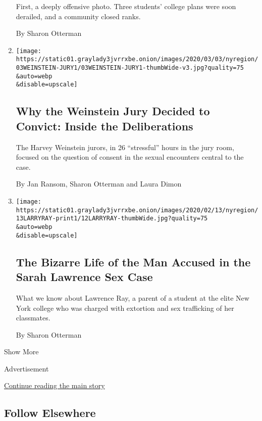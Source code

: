 \begin{enumerate}
  First, a deeply offensive photo. Three students' college plans were
  soon derailed, and a community closed ranks.

  By Sharon Otterman
\item
  \href{/2020/03/02/nyregion/weinstein-verdict-jury.html}{}

  \texttt{[image: https://static01.graylady3jvrrxbe.onion/images/2020/03/03/nyregion/03WEINSTEIN-JURY1/03WEINSTEIN-JURY1-thumbWide-v3.jpg?quality=75\\\&auto=webp\\\&disable=upscale]}

  \hypertarget{why-the-weinstein-jury-decided-to-convict-inside-the-deliberations}{%
  \subsection{Why the Weinstein Jury Decided to Convict: Inside the
  Deliberations}\label{why-the-weinstein-jury-decided-to-convict-inside-the-deliberations}}

  The Harvey Weinstein jurors, in 26 ``stressful'' hours in the jury
  room, focused on the question of consent in the sexual encounters
  central to the case.

  By Jan Ransom, Sharon Otterman and Laura Dimon
\item
  \href{/2020/02/12/nyregion/larry-ray-sarah-lawrence.html}{}

  \texttt{[image: https://static01.graylady3jvrrxbe.onion/images/2020/02/13/nyregion/13LARRYRAY-print1/12LARRYRAY-thumbWide.jpg?quality=75\\\&auto=webp\\\&disable=upscale]}

  \hypertarget{the-bizarre-life-of-the-man-accused-in-the-sarah-lawrence-sex-case}{%
  \subsection{The Bizarre Life of the Man Accused in the Sarah Lawrence
  Sex
  Case}\label{the-bizarre-life-of-the-man-accused-in-the-sarah-lawrence-sex-case}}

  What we know about Lawrence Ray, a parent of a student at the elite
  New York college who was charged with extortion and sex trafficking of
  her classmates.

  By Sharon Otterman
\end{enumerate}

Show More

Advertisement

\protect\hyperlink{after-mid2}{Continue reading the main story}

\hypertarget{follow-elsewhere}{%
\subsection{Follow Elsewhere}\label{follow-elsewhere}}


